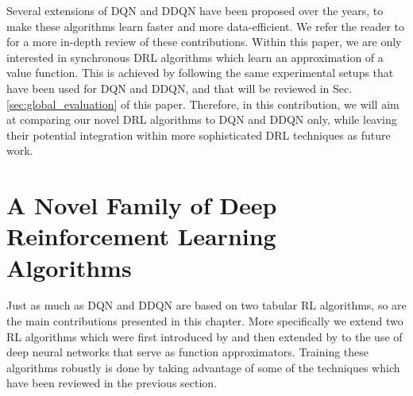 Several extensions of DQN and DDQN have been proposed over the years, to make these algorithms learn faster and more data-efficient. We refer the reader to \cite{li2017deep} for a more in-depth review of these contributions. Within this paper, we are only interested in synchronous DRL algorithms which learn an approximation of a value function. This is achieved by following the same experimental setups that have been used for DQN and DDQN, and that will be reviewed in Sec. \ref{sec:global_evaluation} of this paper. Therefore, in this contribution, we will aim at comparing our novel DRL algorithms to DQN and DDQN only, while leaving their potential integration within more sophisticated DRL techniques as future work.

\section{A Novel Family of Deep Reinforcement Learning Algorithms}
\label{sec:dqv_family}

Just as much as DQN and DDQN are based on two tabular RL algorithms, so are the main contributions presented in this chapter. More specifically we extend two RL algorithms which were first introduced by \citet{wiering2005qv} and then extended by \citet{wiering2009qv} to the use of deep neural networks that serve as function approximators. Training these algorithms robustly is done by taking advantage of some of the techniques which have been reviewed in the previous section.

